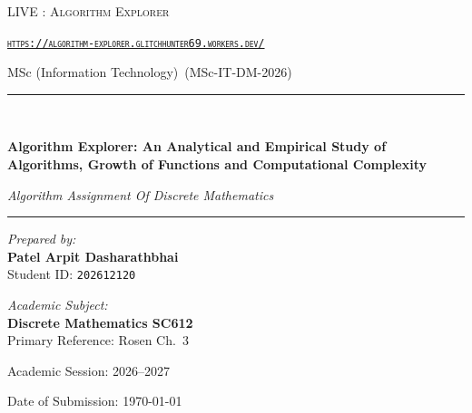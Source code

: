 \documentclass[11pt,a4paper,oneside]{report}
\theoremstyle{definition}
\newcommand{\DocTitle}{Algorithm Explorer: An Analytical and Empirical Study of Algorithms, Growth of Functions and Computational Complexity}
\newcommand{\DocSubtitle}{Algorithm Assignment Of Discrete Mathematics}
\newcommand{\DocAuthor}{Patel Arpit Dasharathbhai}
\newcommand{\DocRollNumber}{202612120}
\newcommand{\DocCourse}{MSc (Information Technology)}
\newcommand{\DocCourseCode}{MSc-IT-DM-2026}
\newcommand{\DocFaculty}{\href{https://algorithm-explorer.glitchhunter69.workers.dev/}{\texttt{https://algorithm-explorer.glitchhunter69.workers.dev/}}}
\newcommand{\DocUniversity}{LIVE : Algorithm Explorer}
\newcommand{\DocAcademicYear}{2026--2027}
\newcommand{\DocDate}{\today}
\begin{document}
\begin{titlepage}
    \centering
    \vspace*{1.0cm}
    
    {\scshape\Large \DocUniversity \par}
    \vspace{0.3cm}
    {\scshape\large \DocFaculty \par}
    \vspace{0.3cm}
    {\large \DocCourse\ (\DocCourseCode) \par}
    
    \vspace{1.5cm}
    \rule{\linewidth}{1.2pt}\\[0.4cm]
    {\huge\bfseries\color{primaryblue} \DocTitle \par}
    \vspace{0.3cm}
    {\large\itshape \DocSubtitle \par}
    \rule{\linewidth}{1.2pt}
    
    \vspace{1.8cm}
    
    \begin{minipage}{0.48\textwidth}
        \begin{flushleft} \large
            \emph{Prepared by:}\\
            \textbf{\DocAuthor}\\
            Student ID: \texttt{\DocRollNumber}
        \end{flushleft}
    \end{minipage}
    \hfill
    \begin{minipage}{0.48\textwidth}
        \begin{flushright} \large
            \emph{Academic Subject:}\\
            \textbf{Discrete Mathematics \- SC612}\\
            Primary Reference: Rosen Ch.~3
        \end{flushright}
    \end{minipage}
    
    \vfill
    
    {\large Academic Session: \DocAcademicYear \par}
    {\large Date of Submission: \DocDate \par}
\end{titlepage}
\end{document}
